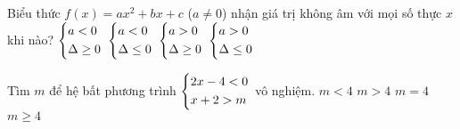 \begin{ex}%
Biểu thức $f(x)=ax^2+bx+c$ ($a\ne 0$) nhận giá trị không âm với mọi số thực $x$ khi nào?
\choice
{$\left\{\begin{aligned}&a<0\\& \Delta \geq 0\end{aligned}\right.$}
{$\left\{\begin{aligned}&a<0\\&\Delta\leq 0\end{aligned}\right.$}
{$\left\{\begin{aligned}&a>0\\&\Delta\geq 0\end{aligned}\right.$}
{\True $\left\{\begin{aligned}&a>0\\&\Delta\leq 0\end{aligned}\right.$}
\end{ex}

\begin{ex}%
Tìm $m$ để hệ bất phương trình $\left\{\begin{aligned}&2x-4<0\\&x+2>m\end{aligned}\right.$ vô nghiệm.
\choice
{$m<4$}
{$m>4$}
{$m=4$}
{\True $m\geq 4$}
\end{ex}

